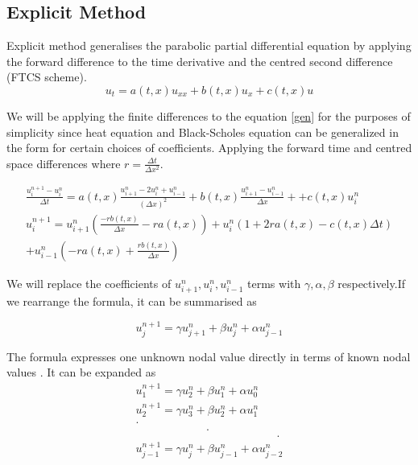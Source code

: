 \documentclass[12pt, oneside]{book}
\theoremstyle{plain}
\theoremstyle{definition}
\begin{document}
\subsection{Explicit Method}
Explicit method generalises the parabolic partial differential equation by applying the forward difference to the time derivative and the centred second difference (FTCS scheme).
\begin{equation} \label{gen}
 u_t = a(t, x)  u_{xx} + b(t, x) u_x + c(t, x) u
\end{equation}

We will be applying the finite differences to the equation  \ref{gen}  for the purposes of simplicity since heat equation and Black-Scholes equation can be generalized in the form for certain choices of coefficients. Applying the forward time and centred space differences where $ r = \frac{\Delta t}{\Delta x^2} $.

\begin{multline}
\frac{u^{n+1}_i - u^n_i}{\Delta t} = a(t, x)  \frac{u^n_{i+1}- 2u^n_i + u^n_{i-1}}{(\Delta x)^2}  + b(t, x)  \frac{u^{n}_{i+1} - u^{n}_{i-1}}{\Delta x} +   + c(t, x) u^n_i \\
u^{n+1}_i = u^n_{i + 1} (\frac{-r b(t,x)}{\Delta x} - r a(t, x)) + u^n_{i}(1 + 2 r a(t, x) - c(t, x) \Delta t) \\
+ u^n_{i - 1} (-r a(t, x) + \frac{r b(t, x)}{\Delta x})
\end{multline}

We will replace the coefficients of $ u^n_{i + 1},  u^n_i,  u^n_{i - 1}$  terms with $\gamma,  \alpha, \beta$ respectively.If we rearrange the formula, it can be summarised as

\begin{equation}
u_j^{n+1} = \gamma u_{j+1}^{n} + \beta u_{j}^{n} + \alpha u_{j-1}^{n} 
\end{equation}

The formula expresses one unknown nodal value directly in terms of known nodal values  \cite{evans}. It can be expanded as
\begin{multline}
u_1^{n+1} = \gamma u_{2}^{n} + \beta u_{1}^{n} + \alpha u_{0}^{n} \\
u_2^{n+1} = \gamma u_{3}^{n} + \beta u_{2}^{n} + \alpha u_{1}^{n} \\
.\\
\hspace{75pt} .\\
\hspace{150pt} .\\
u_{j-1}^{n+1} = \gamma u_{j}^{n} + \beta u_{j-1}^{n} + \alpha u_{j-2}^{n} 
\end{multline}
\end{document}
